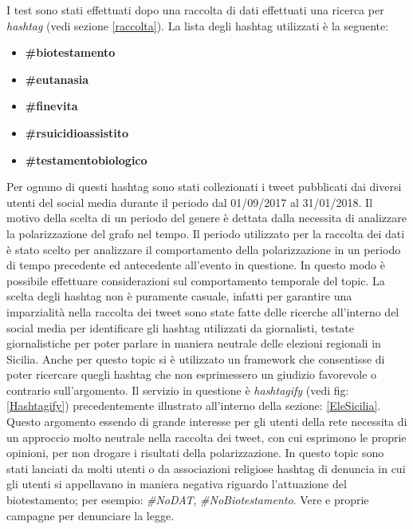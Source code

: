 I test sono stati effettuati dopo una raccolta di dati effettuati una ricerca per \textit{hashtag} (vedi sezione \ref{raccolta}). La lista degli hashtag utilizzati è la seguente:
\begin{itemize}
\item \textbf{\#biotestamento}
\item \textbf{\#eutanasia}
\item \textbf{\#finevita}
\item \textbf{\#rsuicidioassistito}
\item \textbf{\#testamentobiologico}
\end{itemize}
Per ognuno di questi hashtag sono stati collezionati i tweet pubblicati dai diversi utenti del social media durante il periodo dal 01/09/2017 al 31/01/2018.
Il motivo della scelta di un periodo del genere è dettata dalla necessita di analizzare la polarizzazione del grafo nel tempo. Il periodo utilizzato per la raccolta dei dati è stato scelto per analizzare il comportamento della polarizzazione in un periodo di tempo precedente ed antecedente all'evento in questione. In questo modo è possibile effettuare considerazioni sul comportamento temporale del topic.
La scelta degli hashtag non è puramente casuale, infatti per garantire una imparzialità nella raccolta dei tweet sono state fatte delle ricerche all'interno del social media per identificare gli hashtag utilizzati da giornalisti, testate giornalistiche per poter parlare in maniera neutrale delle elezioni regionali in Sicilia.
Anche per questo topic si è utilizzato un framework che consentisse di poter ricercare quegli hashtag che non esprimessero un giudizio favorevole o contrario sull'argomento. Il servizio in questione è \textit{hashtagify} (vedi fig:\ref{Hashtagify}) precedentemente illustrato all'interno della sezione: \ref{EleSicilia}.
Questo argomento essendo di grande interesse per gli utenti della rete necessita di un approccio molto neutrale nella raccolta dei tweet, con cui esprimono le proprie opinioni, per non drogare i risultati della polarizzazione.
In questo topic sono stati lanciati da molti utenti o da associazioni religiose hashtag di denuncia in cui gli utenti si appellavano in maniera negativa riguardo l'attuazione del biotestamento; per esempio: \textit{\#NoDAT}, \textit{\#NoBiotestamento}. Vere e proprie campagne per denunciare la legge.

